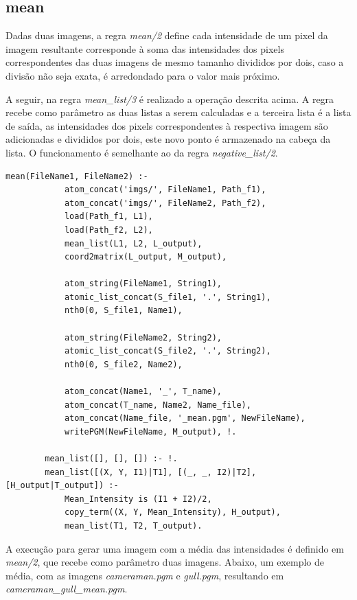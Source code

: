 \documentclass{article}
\begin{document}
    \newpage
    \subsection*{mean}
        Dadas duas imagens, a regra \textit{mean/2} define cada intensidade de um pixel da imagem resultante corresponde à soma das intensidades dos pixels correspondentes das duas imagens de mesmo tamanho divididos por dois, caso a divisão não seja exata, é arredondado para o valor mais próximo.

        A seguir, na regra \textit{mean\_list/3} é realizado a operação descrita acima. A regra recebe como parâmetro as duas listas a serem calculadas e a terceira lista é a lista de saída, as intensidades dos pixels correspondentes à respectiva imagem são adicionadas e divididos por dois, este novo ponto é armazenado na cabeça da lista. O funcionamento é semelhante ao da regra \textit{negative\_list/2}.
        
        \begin{lstlisting}[frame=single]
        mean(FileName1, FileName2) :-
            atom_concat('imgs/', FileName1, Path_f1),
            atom_concat('imgs/', FileName2, Path_f2),
            load(Path_f1, L1),
            load(Path_f2, L2),
            mean_list(L1, L2, L_output),
            coord2matrix(L_output, M_output),
        
            atom_string(FileName1, String1),
            atomic_list_concat(S_file1, '.', String1),
            nth0(0, S_file1, Name1),
        
            atom_string(FileName2, String2),
            atomic_list_concat(S_file2, '.', String2),
            nth0(0, S_file2, Name2),
        
            atom_concat(Name1, '_', T_name),
            atom_concat(T_name, Name2, Name_file),
            atom_concat(Name_file, '_mean.pgm', NewFileName),
            writePGM(NewFileName, M_output), !.
            
        mean_list([], [], []) :- !.
        mean_list([(X, Y, I1)|T1], [(_, _, I2)|T2], [H_output|T_output]) :-
            Mean_Intensity is (I1 + I2)/2,
            copy_term((X, Y, Mean_Intensity), H_output),
            mean_list(T1, T2, T_output).
        \end{lstlisting}
        
        A execução para gerar uma imagem com a média das intensidades é definido em \textit{mean/2}, que recebe como parâmetro duas imagens. Abaixo, um exemplo de média, com as imagens \textit{cameraman.pgm} e \textit{gull.pgm}, resultando em \textit{cameraman\_gull\_mean.pgm}.
    
\end{document}
